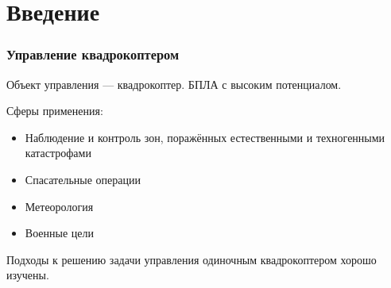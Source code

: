 \documentclass[10pt]{beamer}
\begin{document}
\section{Введение}
\begin{frame}
	\frametitle{Управление квадрокоптером}
	Объект управления — квадрокоптер. БПЛА с высоким потенциалом. \par
	\bigskip
	Сферы применения:\par
	\begin{itemize}
		\item Наблюдение и контроль зон, поражённых естественными и техногенными катастрофами
		\item Спасательные операции
		\item Метеорология
		\item Военные цели
	\end{itemize}
	\bigskip
	Подходы к решению задачи управления одиночным квадрокоптером хорошо изучены. 
	
\end{frame}
\end{document}
